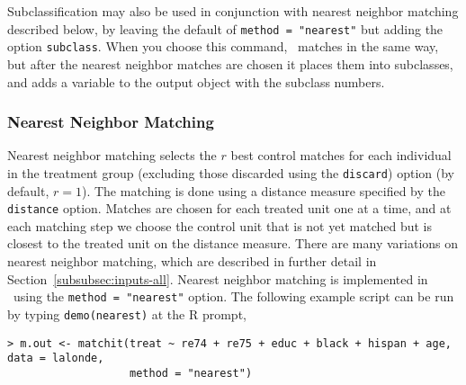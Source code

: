 Subclassification may also be used in conjunction with nearest
neighbor matching described below, by leaving the default of
\texttt{method = "nearest"} but adding the option \texttt{subclass}.
When you choose this command, \MatchIt\ matches in the same way, but
after the nearest neighbor matches are chosen it places them into
subclasses, and adds a variable to the output object with the subclass
numbers.

\subsubsection{Nearest Neighbor Matching}
\label{subsubsec:nearest}

Nearest neighbor matching selects the $r$ best control matches for
each individual in the treatment group (excluding those discarded
using the \texttt{discard}) option (by default, $r=1$).  The matching
is done using a distance measure specified by the {\tt distance}
option. Matches are chosen for each treated unit one at a time, and at
each matching step we choose the control unit that is not yet matched
but is closest to the treated unit on the distance measure.  There are
many variations on nearest neighbor matching, which are described in
further detail in
Section~\ref{subsubsec:inputs-all}.
Nearest neighbor matching is implemented in \MatchIt\ using the
\texttt{method = "nearest"} option.  The following example script can
be run by typing {\tt demo(nearest)} at the R prompt,
\begin{verbatim}
> m.out <- matchit(treat ~ re74 + re75 + educ + black + hispan + age, data = lalonde, 
                   method = "nearest")
\end{verbatim}



